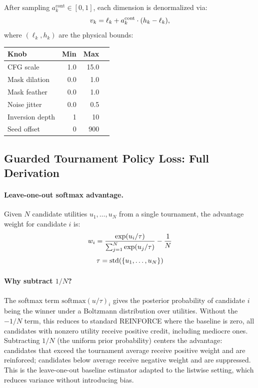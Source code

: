 After sampling $a_k^\text{cont} \in [0,1]$, each dimension is
denormalized via:
\begin{equation}
  v_k = \ell_k + a_k^\text{cont} \cdot (h_k - \ell_k), \notag
\end{equation}
where $(\ell_k, h_k)$ are the physical bounds:

\begin{center}
\small
\begin{tabular}{lrrl}
\toprule
\textbf{Knob} & \textbf{Min} & \textbf{Max}\\
\midrule
CFG scale       & 1.0  & 15.0  \\
Mask dilation   & 0.0  & 1.0   \\
Mask feather    & 0.0  & 1.0   \\
Noise jitter    & 0.0  & 0.5   \\
Inversion depth & 1    & 10    \\
Seed offset     & 0    & 900   \\
\bottomrule
\end{tabular}
\end{center}

\subsection{Guarded Tournament Policy Loss: Full Derivation}
\label{app:tspo_loss}

\paragraph{Leave-one-out softmax advantage.}
Given $N$ candidate utilities $u_1, \ldots, u_N$ from a single tournament,
the advantage weight for candidate $i$ is:
\begin{equation}
  w_i = \frac{\exp(u_i / \tau)}{\sum_{j=1}^N \exp(u_j / \tau)} - \frac{1}{N}\notag
  \label{eq:tspo_advantage}
\end{equation}
\begin{equation}
 \tau = \mathrm{std}(\{u_1, \ldots, u_N\}) \notag
\end{equation}

\paragraph{Why subtract $1/N$?}
The softmax term $\mathrm{softmax}(u/\tau)_i$ gives the posterior
probability of candidate $i$ being the winner under a Boltzmann
distribution over utilities.
Without the $-1/N$ term, this reduces to standard REINFORCE where the
baseline is zero, all candidates with nonzero utility receive positive
credit, including mediocre ones.
Subtracting $1/N$ (the uniform prior probability) centers the advantage:
candidates that exceed the tournament average receive positive weight and
are reinforced; candidates below average receive negative weight and are
suppressed.
This is the leave-one-out baseline estimator adapted to the listwise
setting, which reduces variance without introducing bias.

